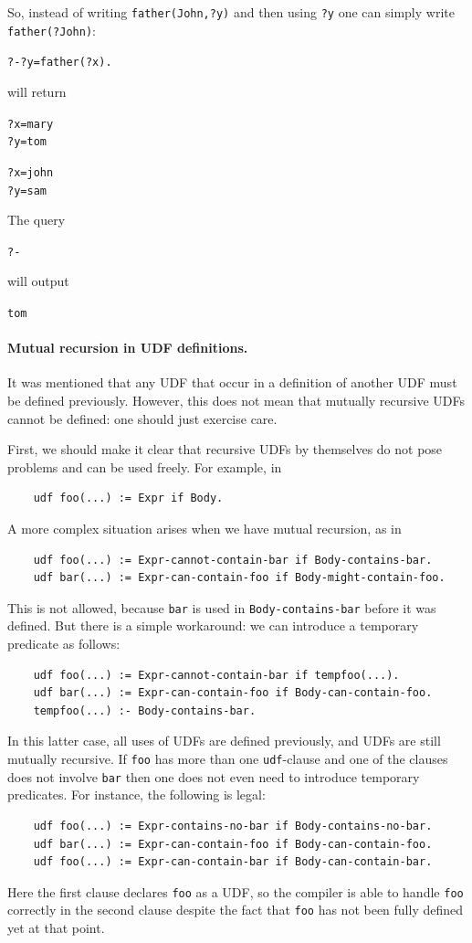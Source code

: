 \documentclass[11pt]{article}
\begin{document}
So, instead of writing \texttt{father(John,?y)}  and then using \texttt{?y}
one can simply write \texttt{father(?John)}:  
\begin{alltt}
    ?- ?y=father(?x).
\end{alltt}
will return
\begin{alltt}
    ?x=mary
    ?y=tom

    ?x=john
    ?y=sam
\end{alltt}
The query
\begin{alltt}
    ?- %
\end{alltt}
will output
\begin{alltt}
    tom
\end{alltt}

\paragraph{Mutual recursion in UDF definitions.}
It was mentioned that any UDF that occur in a definition of another UDF
must be defined previously. However, this does not mean that mutually
recursive UDFs cannot be defined: one should just exercise care.

First, we should make it clear that recursive UDFs by themselves do not
pose problems and can be used freely.  For example, in
\begin{verbatim}
    udf foo(...) := Expr if Body.
\end{verbatim}
A more complex situation arises when we have mutual recursion, as in
\begin{verbatim}
    udf foo(...) := Expr-cannot-contain-bar if Body-contains-bar.
    udf bar(...) := Expr-can-contain-foo if Body-might-contain-foo.
\end{verbatim}
This is not allowed, because \texttt{bar} is used in
\texttt{Body-contains-bar} before it was defined.
But there is a simple workaround: we can introduce a
temporary predicate as follows:
\begin{verbatim}
    udf foo(...) := Expr-cannot-contain-bar if tempfoo(...).
    udf bar(...) := Expr-can-contain-foo if Body-can-contain-foo.
    tempfoo(...) :- Body-contains-bar.
\end{verbatim}
In this latter case, all uses of UDFs are defined previously, and UDFs are
still mutually recursive. If \texttt{foo} has more than one
\texttt{udf}-clause and one of the clauses does not involve
\texttt{bar} then one does not even need to introduce temporary predicates. For
instance, the following is legal:   
\begin{verbatim}
    udf foo(...) := Expr-contains-no-bar if Body-contains-no-bar.
    udf bar(...) := Expr-can-contain-foo if Body-can-contain-foo.
    udf foo(...) := Expr-can-contain-bar if Body-can-contain-bar.
\end{verbatim}
Here the first clause declares \texttt{foo} as a UDF, so the compiler is
able to handle \texttt{foo} correctly in the second clause despite the fact
that \texttt{foo} has not been fully defined yet at that point. 
\end{document}
